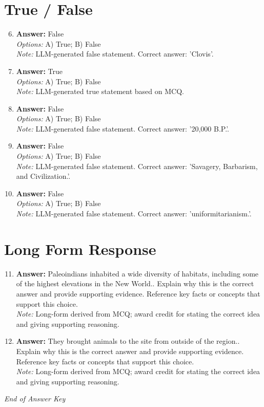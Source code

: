 \documentclass[12pt]{article}
\begin{document}
\section*{True / False}
\begin{enumerate}[label=\arabic*.]
\setcounter{enumi}{5}
\item \textbf{Answer:} False
\\ \textit{Options:} A) True; B) False
\\ \textit{Note:} LLM-generated false statement. Correct answer: 'Clovis'.
\item \textbf{Answer:} True
\\ \textit{Options:} A) True; B) False
\\ \textit{Note:} LLM-generated true statement based on MCQ.
\item \textbf{Answer:} False
\\ \textit{Options:} A) True; B) False
\\ \textit{Note:} LLM-generated false statement. Correct answer: '20,000 B.P.'.
\item \textbf{Answer:} False
\\ \textit{Options:} A) True; B) False
\\ \textit{Note:} LLM-generated false statement. Correct answer: 'Savagery, Barbarism, and Civilization.'.
\item \textbf{Answer:} False
\\ \textit{Options:} A) True; B) False
\\ \textit{Note:} LLM-generated false statement. Correct answer: 'uniformitarianism.'.
\end{enumerate}

\section*{Long Form Response}
\begin{enumerate}[label=\arabic*.]
\setcounter{enumi}{10}
\item \textbf{Answer:} Paleoindians inhabited a wide diversity of habitats, including some of the highest elevations in the New World.. Explain why this is the correct answer and provide supporting evidence. Reference key facts or concepts that support this choice.
\\ \textit{Note:} Long-form derived from MCQ; award credit for stating the correct idea and giving supporting reasoning.
\item \textbf{Answer:} They brought animals to the site from outside of the region.. Explain why this is the correct answer and provide supporting evidence. Reference key facts or concepts that support this choice.
\\ \textit{Note:} Long-form derived from MCQ; award credit for stating the correct idea and giving supporting reasoning.
\end{enumerate}

\vfill
\noindent\textit{End of Answer Key}
\end{document}

